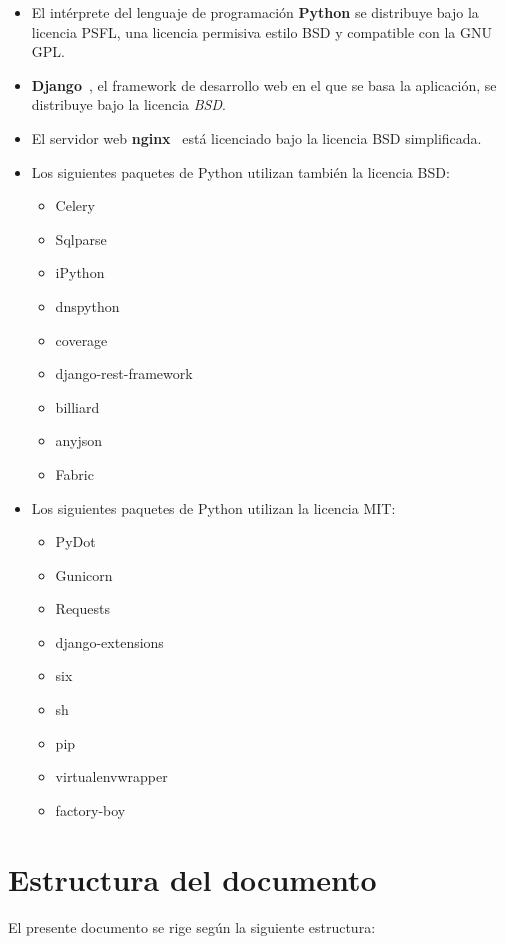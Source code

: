 \begin{itemize}
\item El intérprete del lenguaje de programación \textbf{Python} se distribuye
  bajo la licencia \ac{PSFL}, una licencia permisiva estilo \ac{BSD} y
  compatible con la \ac{GNU} \ac{GPL}.

\item \textbf{Django}~\cite{django}, el framework de desarrollo web en el que se
  basa la aplicación, se distribuye bajo la licencia \textit{\ac{BSD}}.

\item El servidor web \textbf{nginx}~\cite{nginx} está licenciado bajo la
  licencia \ac{BSD} simplificada.

\item Los siguientes paquetes de Python utilizan también la licencia \ac{BSD}:
  \begin{itemize}
  \item Celery
  \item Sqlparse
  \item iPython
  \item dnspython
  \item coverage
  \item django-rest-framework
  \item billiard
  \item anyjson
  \item Fabric
  \end{itemize}

\item Los siguientes paquetes de Python utilizan la licencia \ac{MIT}:
  \begin{itemize}
  \item PyDot
  \item Gunicorn
  \item Requests
  \item django-extensions
  \item six
  \item sh
  \item pip
  \item virtualenvwrapper
  \item factory-boy
  \end{itemize}

\end{itemize}

\section{Estructura del documento}
El presente documento se rige según la siguiente estructura:

